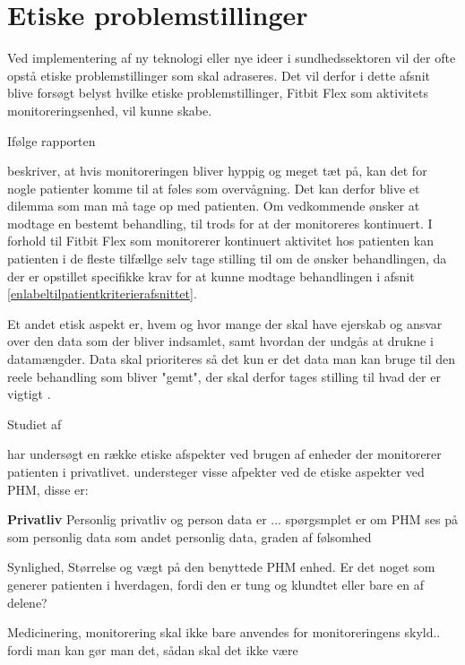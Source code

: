 \section{Etiske problemstillinger}

Ved implementering af ny teknologi eller nye ideer i sundhedssektoren vil der ofte opstå etiske problemstillinger som skal adraseres. Det vil derfor i dette afsnit blive forsøgt belyst hvilke etiske problemstillinger, Fitbit Flex som aktivitets monitoreringsenhed, vil kunne skabe.

Ifølge rapporten \author{patienthome2015} beskriver, at hvis monitoreringen bliver hyppig og meget tæt på, kan det for nogle patienter komme til at føles som overvågning. Det kan derfor blive et dilemma som man må tage op med patienten. Om vedkommende ønsker at modtage en bestemt behandling, til trods for at der monitoreres kontinuert. I forhold til Fitbit Flex som monitorerer kontinuert aktivitet hos patienten kan patienten i de fleste tilfællge selv tage stilling til om de ønsker behandlingen, da der er opstillet specifikke krav for at kunne modtage behandlingen i afsnit \autoref{enlabeltilpatientkriterierafsnittet}. 

Et andet etisk aspekt er, hvem og hvor mange der skal have ejerskab og ansvar over den data som der bliver indsamlet, samt hvordan der undgås at drukne i datamængder. Data skal prioriteres så det kun er det data man kan bruge til den reele behandling som bliver "gemt", der skal derfor tages stilling til hvad der er vigtigt \citep{patienthome2015}.

Studiet af \author{Mittelstand2011} har undersøgt en række etiske afspekter ved brugen af enheder der monitorerer patienten i privatlivet. understeger visse afpekter ved de etiske aspekter ved PHM, disse er:

\textbf{Privatliv}
Personlig privatliv og person data er ... spørgsmplet er om PHM ses på som personlig data som andet personlig data, graden af følsomhed

Synlighed, 
Størrelse og vægt på den benyttede PHM enhed. Er det noget som generer patienten i hverdagen, fordi den er tung og klundtet eller bare en af delene? 

Medicinering, 
monitorering skal ikke bare anvendes for monitoreringens skyld.. fordi man kan gør man det, sådan skal det ikke være

